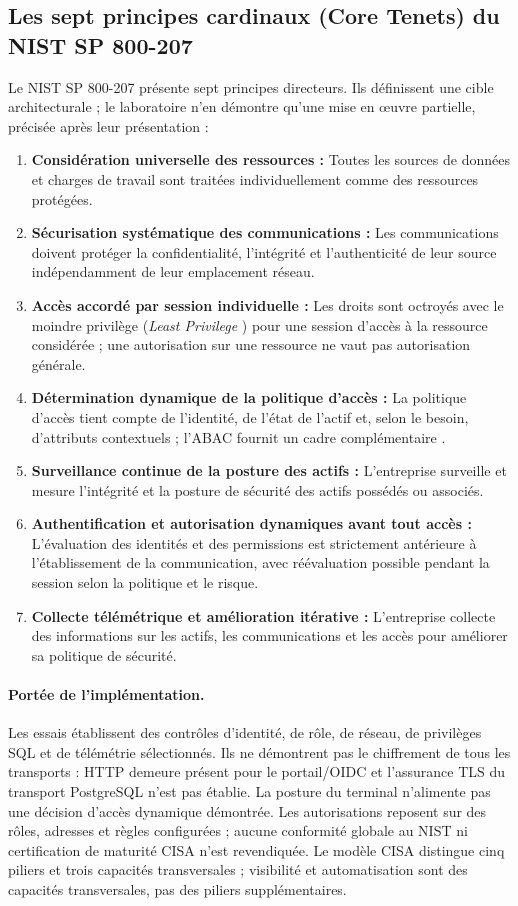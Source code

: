 \documentclass[a4paper,12pt]{report}
\begin{document}
\subsection{Les sept principes cardinaux (Core Tenets) du NIST SP 800-207}
Le NIST SP 800-207 présente sept principes directeurs. Ils définissent une cible architecturale ; le laboratoire n'en démontre qu'une mise en œuvre partielle, précisée après leur présentation :
\begin{enumerate}
    \item \textbf{Considération universelle des ressources :} Toutes les sources de données et charges de travail sont traitées individuellement comme des ressources protégées.
    \item \textbf{Sécurisation systématique des communications :} Les communications doivent protéger la confidentialité, l'intégrité et l'authenticité de leur source indépendamment de leur emplacement réseau.
    \item \textbf{Accès accordé par session individuelle :} Les droits sont octroyés avec le moindre privilège (\textit{Least Privilege} \cite{saltzer1975, nist800_53}) pour une session d'accès à la ressource considérée ; une autorisation sur une ressource ne vaut pas autorisation générale.
    \item \textbf{Détermination dynamique de la politique d'accès :} La politique d'accès tient compte de l'identité, de l'état de l'actif et, selon le besoin, d'attributs contextuels ; l'ABAC fournit un cadre complémentaire \cite{nist_abac}.
    \item \textbf{Surveillance continue de la posture des actifs :} L'entreprise surveille et mesure l'intégrité et la posture de sécurité des actifs possédés ou associés.
    \item \textbf{Authentification et autorisation dynamiques avant tout accès :} L'évaluation des identités et des permissions est strictement antérieure à l'établissement de la communication, avec réévaluation possible pendant la session selon la politique et le risque.
    \item \textbf{Collecte télémétrique et amélioration itérative :} L'entreprise collecte des informations sur les actifs, les communications et les accès pour améliorer sa politique de sécurité.
\end{enumerate}

\paragraph{Portée de l'implémentation.} Les essais établissent des contrôles d'identité, de rôle, de réseau, de privilèges SQL et de télémétrie sélectionnés. Ils ne démontrent pas le chiffrement de tous les transports : HTTP demeure présent pour le portail/OIDC et l'assurance TLS du transport PostgreSQL n'est pas établie. La posture du terminal n'alimente pas une décision d'accès dynamique démontrée. Les autorisations reposent sur des rôles, adresses et règles configurées ; aucune conformité globale au NIST ni certification de maturité CISA n'est revendiquée. Le modèle CISA distingue cinq piliers et trois capacités transversales ; visibilité et automatisation sont des capacités transversales, pas des piliers supplémentaires.
\end{document}
